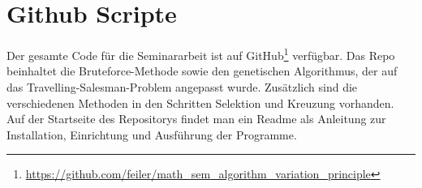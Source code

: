 %
%
%
%
\section{Github Scripte
\label{buch:paper:varalg:section:github_scripte}}

Der gesamte Code für die Seminararbeit ist auf GitHub\footnote{
    \url{https://github.com/feiler/math_sem_algorithm_variation_principle}
    }
\cite{varalg:repo} verfügbar. Das Repo beinhaltet die Bruteforce-Methode sowie
den genetischen Algorithmus, der auf das Travelling-Salesman-Problem angepasst wurde. Zusätzlich
sind die verschiedenen Methoden in den Schritten Selektion und Kreuzung vorhanden.
Auf der Startseite des Repositorys findet man ein Readme als Anleitung zur 
Installation, Einrichtung und Ausführung der Programme.
